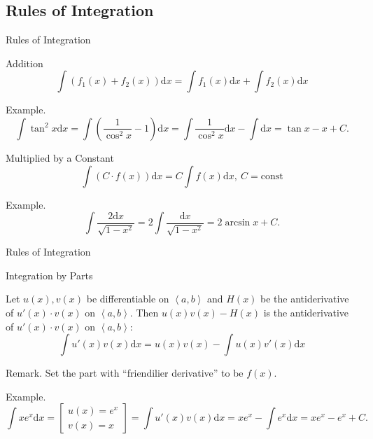 \documentclass{beamer}
\begin{document}
    \subsection{Rules of Integration}
    \begin{frame}[t]{Rules of Integration}
        \begin{block}{Addition}
            $$\int\left(f_{1}(x)+f_{2}(x)\right) \mathrm{d}x=\int f_{1}(x) \mathrm{d}x+\int f_{2}(x) \mathrm{d}x$$
        \end{block}
        \par \textcolor{yy}{Example.} $$\int \tan^2 x\mathrm{d}x = \int \left(\dfrac{1}{\cos^2 x} - 1\right)\mathrm{d}x = \int \dfrac{1}{\cos^2x}\mathrm{d}x - \int \mathrm{d}x = \tan x - x + C.$$

        \begin{block}{Multiplied by a Constant}
            $$\int (C\cdot f(x))\mathrm{d}x = C\int f(x)\mathrm{d}x,\ C = \text{const}$$
        \end{block}
        \par \textcolor{yy}{Example.} $$\int \dfrac{2\mathrm{d}x}{\sqrt{1-x^2}} = 2\int\dfrac{\mathrm{d}x}{\sqrt{1-x^2}} = 2\arcsin x + C.$$
    \end{frame}

    \begin{frame}[t]{Rules of Integration}
        \begin{block}{Integration by Parts}
            \par Let $u(x),v(x)$ be differentiable on $\left\langle a, b\right\rangle$ and $H(x)$ be the antiderivative of $u'(x)\cdot v(x)$ on $\left\langle a, b\right\rangle$. Then $u(x)v(x) - H(x)$ is the antiderivative of $u'(x)\cdot v(x)$ on $\left\langle a, b\right\rangle$: $$\int u'(x)v(x)\mathrm{d}x = u(x)v(x) - \int u(x)v'(x)\mathrm{d}x$$
        \end{block}
        \par \textcolor{yy}{Remark.} Set the part with ``friendilier derivative'' to be $f(x)$.
        \par \textcolor{yy}{Example.}
        \begin{equation*}
            \int xe^x\mathrm{d}x = \left[\begin{array}{l}
                u(x) = e^x \\ v(x) = x
            \end{array}\right] = \int u'(x)v(x) \mathrm{d}x = xe^x - \int e^x\mathrm{d}x = xe^x - e^x + C.
        \end{equation*}
    \end{frame}
\end{document}
